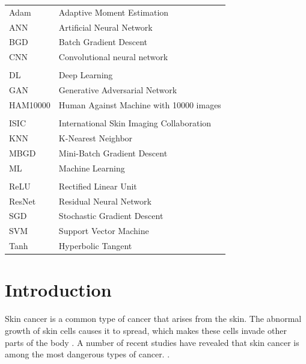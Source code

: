 \documentclass[12pt]{diazessay}
\begin{document}
\begin{table}[H]
    \setlength{\tabcolsep}{20pt}
    \renewcommand{\arraystretch}{1.3}
    \large
    \begin{tabular}{l l}

    Adam & Adaptive Moment Estimation \\
    ANN	     & Artificial Neural Network \\
    BGD	 & Batch Gradient Descent \\
    CNN	     & Convolutional neural network \\ 

    \vspace{0.2cm} & \vspace{0.2cm} \\

    DL  	 & Deep Learning \\
    GAN	     & Generative Adversarial Network \\
    HAM10000 & Human Against Machine with 10000 images \\

    \vspace{0.2cm} & \vspace{0.2cm} \\

    ISIC	 & International Skin Imaging Collaboration \\
    KNN	 & K-Nearest Neighbor \\
    MBGD & Mini-Batch Gradient Descent \\
    ML	 & Machine Learning \\

    \vspace{0.2cm} & \vspace{0.2cm} \\
    
    ReLU & Rectified Linear Unit\\
    ResNet	 & Residual Neural Network \\
    SGD	 & Stochastic Gradient Descent \\
    SVM  & Support Vector Machine \\
    Tanh & Hyperbolic Tangent\\

    
    \end{tabular}
\end{table} 

    
    \newpage
    
    \section{Introduction}
    \-\hspace{0.7cm} Skin cancer is a common type of cancer that arises from the skin. The abnormal growth of skin cells causes it to spread, which makes these cells invade other parts of the body \cite{narayanamurthy2018skin}. A number of recent studies have revealed that skin cancer is among the most dangerous types of cancer.  \cite{jain2015computer}. 
    
\end{document}
